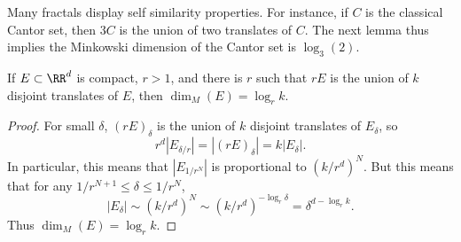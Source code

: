 Many fractals display self similarity properties. For instance, if $C$ is the classical Cantor set, then $3C$ is the union of two translates of $C$. The next lemma thus implies the Minkowski dimension of the Cantor set is $\log_3(2)$.

\begin{theorem}
	If $E \subset \RR^d$ is compact, $r > 1$, and there is $r$ such that $rE$ is the union of $k$ disjoint translates of $E$, then $\dim_M(E) = \log_r k$.
\end{theorem}
\begin{proof}
	For small $\delta$, $(rE)_\delta$ is the union of $k$ disjoint translates of $E_\delta$, so
	\[ r^d |E_{\delta/r}| = |(rE)_\delta| = k |E_\delta|. \]
	In particular, this means that $|E_{1/r^N}|$ is proportional to $(k/r^d)^N$. But this means that for any $1/r^{N+1} \leq \delta \leq 1/r^N$,
	\[ |E_\delta| \sim (k/r^d)^N \sim (k/r^d)^{-\log_r \delta} = \delta^{d - \log_r k}. \]
	Thus $\dim_M(E) = \log_r k$.
\end{proof}

